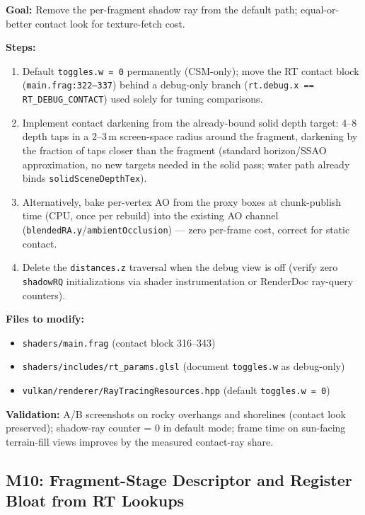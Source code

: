 \documentclass[11pt,a4paper]{article}
\begin{document}
\begin{tcolorbox}[promptbox={Prompt: Replace RT Contact Shadows with Screen-Space Contact Darkening}]
\textbf{Goal:} Remove the per-fragment shadow ray from the default path; equal-or-better contact look for texture-fetch cost.

\textbf{Steps:}
\begin{enumerate}
    \item Default \texttt{toggles.w = 0} permanently (CSM-only); move the RT contact block (\texttt{main.frag:322--337}) behind a debug-only branch (\texttt{rt.debug.x == RT\_DEBUG\_CONTACT}) used solely for tuning comparisons.
    \item Implement contact darkening from the already-bound solid depth target: 4--8 depth taps in a 2--3\,m screen-space radius around the fragment, darkening by the fraction of taps closer than the fragment (standard horizon/SSAO approximation, no new targets needed in the solid pass; water path already binds \texttt{solidSceneDepthTex}).
    \item Alternatively, bake per-vertex AO from the proxy boxes at chunk-publish time (CPU, once per rebuild) into the existing AO channel (\texttt{blendedRA.y}/\texttt{ambientOcclusion}) --- zero per-frame cost, correct for static contact.
    \item Delete the \texttt{distances.z} traversal when the debug view is off (verify zero \texttt{shadowRQ} initializations via shader instrumentation or RenderDoc ray-query counters).
\end{enumerate}

\textbf{Files to modify:}
\begin{itemize}
    \item \texttt{shaders/main.frag} (contact block 316--343)
    \item \texttt{shaders/includes/rt\_params.glsl} (document \texttt{toggles.w} as debug-only)
    \item \texttt{vulkan/renderer/RayTracingResources.hpp} (default \texttt{toggles.w = 0})
\end{itemize}

\textbf{Validation:} A/B screenshots on rocky overhangs and shorelines (contact look preserved); shadow-ray counter = 0 in default mode; frame time on sun-facing terrain-fill views improves by the measured contact-ray share.
\end{tcolorbox}

\subsection{M10: Fragment-Stage Descriptor and Register Bloat from RT Lookups}
\end{document}
